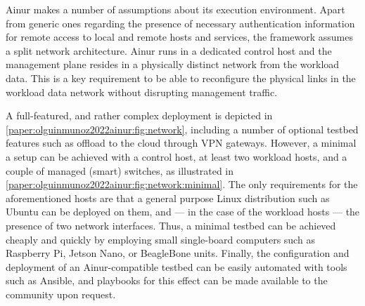 Ainur makes a number of assumptions about its execution environment.
Apart from generic ones regarding the presence of necessary authentication information for remote access to local and remote hosts and services, the framework assumes a split network architecture.
Ainur runs in a dedicated control host and the management plane resides in a physically distinct network from the workload data.
This is a key requirement to be able to reconfigure the physical links in the workload data network without disrupting management traffic.

A full-featured, and rather complex deployment is depicted in \cref{paper:olguinmunoz2022ainur:fig:network}, including a number of optional testbed features such as offload to the cloud through \gls{VPN} gateways.
However, a minimal a setup can be achieved with a control host, at least two workload hosts, and a couple of managed (smart) switches, as illustrated in \cref{paper:olguinmunoz2022ainur:fig:network:minimal}.
The only requirements for the aforementioned hosts are that a general purpose Linux distribution such as Ubuntu can be deployed on them, and --- in the case of the workload hosts --- the presence of two network interfaces.
Thus, a minimal testbed can be achieved cheaply and quickly by employing small single-board computers such as Raspberry Pi, Jetson Nano, or BeagleBone units.
Finally, the configuration and deployment of an Ainur-compatible testbed can be easily automated with tools such as Ansible, and playbooks for this effect can be made available to the community upon request.

